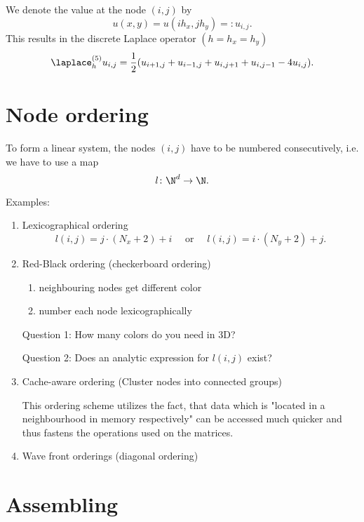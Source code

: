 We denote the value at the node $(i,j)$ by
\[
	u(x,y)=u(ih_{x},jh_{y})=:u_{i,j}
.\] 
This results in the discrete Laplace operator $(h=h_{x}=h_{y})$
\[
	\laplace_{h}^{(5)}u_{i,j}=\frac{1}{2}(u_{i+1,j}+u_{i-1,j} +u_{i,j+1}+ u_{i,j-1} - 4u_{i,j})
.\]

\section{Node ordering}%
\label{sec:Node ordering}
To form a linear system, the nodes $(i,j)$ have to be numbered consecutively, i.e. we have to use a map
\[
	l\colon \N^{d} \rightarrow \N
.\] 

Examples:

\begin{enumerate}[label=\alph{enumi})]
	\item  Lexicographical ordering
		\[
			l(i,j) = j \cdot (N_{x} + 2) + i 
			\quad\text{ or }\quad
			l(i,j) = i \cdot (N_{y} + 2) + j
		.\] 

	\item Red-Black ordering (checkerboard ordering)

		\begin{enumerate}[label=\arabic{enumii})]
			\item neighbouring nodes get different color
			\item number each node lexicographically
		\end{enumerate}


		Question 1: How many colors do you need in 3D?

		Question 2: Does an analytic expression for $l(i,j)$ exist?
	\item Cache-aware ordering (Cluster nodes into connected groups)

		
		This ordering scheme utilizes the fact, that data which is "located in a neighbourhood in memory respectively" can be accessed much quicker and thus fastens the operations used on the matrices.

	\item Wave front orderings (diagonal ordering)

\end{enumerate}

\section{Assembling}%
\label{sec:Assembling}


